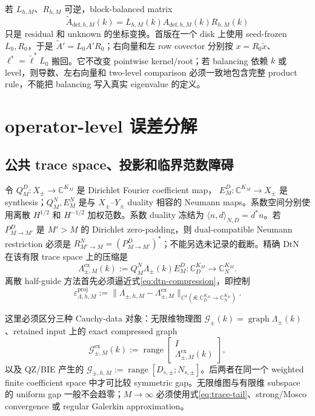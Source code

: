\documentclass[UTF8,fontset=fandol,11pt,a4paper]{ctexart}
\newcommand{\cG}{\mathcal G}
\begin{document}
若
$L_{h,M}$、$R_{h,M}$ 可逆，block-balanced matrix
\[
  \widetilde A_{\mathrm{def},h,M}(k)
  =L_{h,M}(k)A_{\mathrm{def},h,M}(k)R_{h,M}(k)
\]
只是 residual 和 unknown 的坐标变换。首版在一个 disk 上使用 seed-frozen
$L_0,R_0$，于是 $\widetilde A'=L_0A'R_0$；右向量和左 row covector 分别按
$x=R_0\widetilde x$、$\ell^*=\widetilde\ell^*L_0$ 搬回。它不改变 pointwise
kernel/root；若 balancing 依赖 $k$ 或 level，则导数、左右向量和 two-level comparison
必须一致地包含完整 product rule，不能把 balancing 写入真实 eigenvalue 的定义。

\section{operator-level 误差分解}

\subsection{公共 trace space、投影和临界范数障碍}

令 $Q_M^D:X_\pm\to\mathbb C^{K_M}$ 是 Dirichlet Fourier coefficient map，
$E_M^D:\mathbb C^{K_M}\to X_\pm$ 是 synthesis；$Q_M^N,E_M^N$ 是与
$X_\pm$--$Y_\pm$ duality 相容的 Neumann maps。系数空间分别使用离散
$H^{1/2}$ 和 $H^{-1/2}$ 加权范数。系数 duality 冻结为
$\langle n,d\rangle_{N,D}=d^*n$。若 $P_{M\to M'}^D$ 是 $M'>M$ 的 Dirichlet
zero-padding，则 dual-compatible Neumann restriction 必须是
$R_{M'\to M}^N=(P_{M\to M'}^D)^*$；不能另选未记录的截断。精确 DtN 在该有限 trace space 上的压缩是
\begin{equation}
  \Lambda_{\pm,M}^{\mathrm{ex}}(k)
  :=Q_M^N\Lambda_\pm(k)E_M^D:
  \mathbb C_D^{K_M}\longrightarrow\mathbb C_N^{K_M}.
  \label{eq:dtn-compression}
\end{equation}
离散 half-guide 方法首先必须逼近式\eqref{eq:dtn-compression}，即控制
\begin{equation}
  \varepsilon_{\Lambda,h,M}^{\mathrm{proj}}
  :=\|\Lambda_{\pm,h,M}-\Lambda_{\pm,M}^{\mathrm{ex}}\|_{C^1(\mathfrak K;
  \mathbb C_D^{K_M}\to\mathbb C_N^{K_M})}.
  \label{eq:dtn-projected-target}
\end{equation}

这里必须区分三种 Cauchy-data 对象：无限维物理图
$\cG_\pm(k)=\operatorname{graph}\Lambda_\pm(k)$、retained input 上的 exact compressed
graph
\[
  \cG_{\pm,M}^{\mathrm{ex}}(k)
  :=\operatorname{range}
  \begin{bmatrix}I\\\Lambda_{\pm,M}^{\mathrm{ex}}(k)\end{bmatrix},
\]
以及 QZ/BIE 产生的
$\cG_{\pm,h,M}:=\operatorname{range}[D_{s,\pm};N_{s,\pm}]$。后两者在同一个 weighted
finite coefficient space 中才可比较 symmetric gap。无限维图与有限维 subspace 的
uniform gap 一般不会趋零；$M\to\infty$ 必须使用式\eqref{eq:trace-tail}、strong/Mosco
convergence 或 regular Galerkin approximation。
\end{document}
